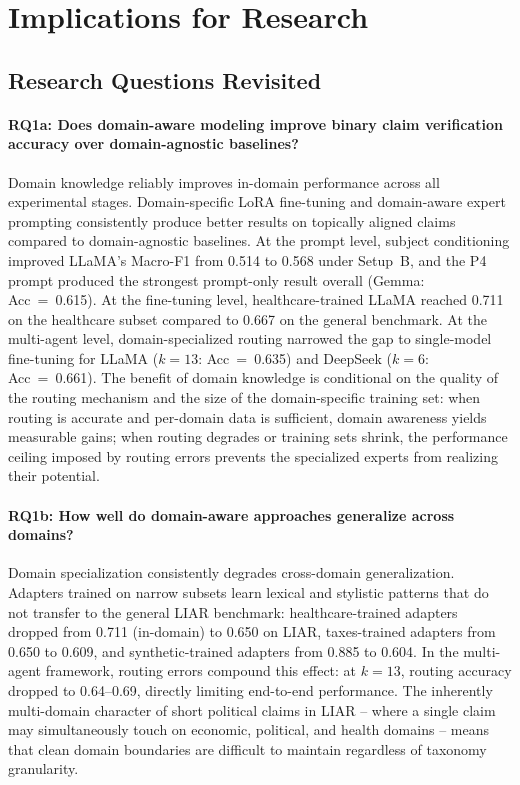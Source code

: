 \section{Implications for Research}
\label{sec:implications}

\subsection*{Research Questions Revisited}

\paragraph{RQ1a: Does domain-aware modeling improve binary claim verification accuracy over domain-agnostic baselines?}
Domain knowledge reliably improves in-domain performance across all experimental stages. Domain-specific LoRA fine-tuning and domain-aware expert prompting consistently produce better results on topically aligned claims compared to domain-agnostic baselines. At the prompt level, subject conditioning improved LLaMA's Macro-F1 from 0.514 to 0.568 under Setup~B, and the P4 prompt produced the strongest prompt-only result overall (Gemma: Acc~=~0.615). At the fine-tuning level, healthcare-trained LLaMA reached 0.711 on the healthcare subset compared to 0.667 on the general benchmark. At the multi-agent level, domain-specialized routing narrowed the gap to single-model fine-tuning for LLaMA ($k{=}13$: Acc~=~0.635) and DeepSeek ($k{=}6$: Acc~=~0.661). The benefit of domain knowledge is conditional on the quality of the routing mechanism and the size of the domain-specific training set: when routing is accurate and per-domain data is sufficient, domain awareness yields measurable gains; when routing degrades or training sets shrink, the performance ceiling imposed by routing errors prevents the specialized experts from realizing their potential.

\paragraph{RQ1b: How well do domain-aware approaches generalize across domains?}
Domain specialization consistently degrades cross-domain generalization. Adapters trained on narrow subsets learn lexical and stylistic patterns that do not transfer to the general LIAR benchmark: healthcare-trained adapters dropped from 0.711 (in-domain) 
to 0.650 on LIAR, taxes-trained adapters from 0.650 to 0.609, and synthetic-trained adapters from 0.885 to 0.604. In the multi-agent 
framework, routing errors compound this effect: at $k{=}13$, routing accuracy dropped to 0.64--0.69, directly limiting end-to-end 
performance. The inherently multi-domain character of short political claims in LIAR -- where a single claim may simultaneously touch on economic, political, and health domains -- means that clean domain boundaries are difficult to maintain regardless of taxonomy granularity.

